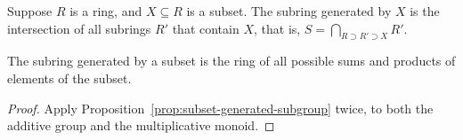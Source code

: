 \begin{definition}
    Suppose \(R\) is a ring, and \(X \subseteq R\) is a subset.
    The subring generated by \(X\)
    is the intersection of all subrings \(R'\) that contain \(X\),
    that is, \(S = \bigcap_{R \supset R' \supset X} R'\).
\end{definition}
\begin{proposition}\label{prop:subset-generated-subring}
    The subring generated by a subset
    is the ring of all possible sums and products of elements of the subset.
\end{proposition}
\begin{proof}
    Apply Proposition~\ref{prop:subset-generated-subgroup} twice,
    to both the additive group and the multiplicative monoid.
\end{proof}


